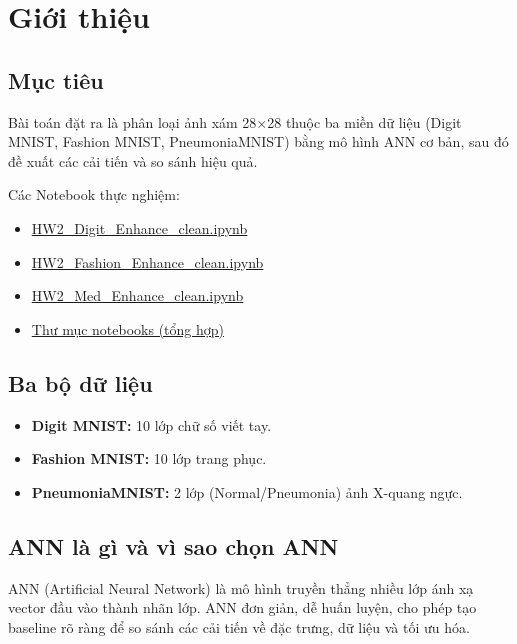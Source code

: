 \documentclass[a4paper,12pt]{report}
\begin{document}
\newpage
\listoffigures
\newpage
\listoftables
\newpage
\tableofcontents
\newpage

\section{Giới thiệu}
\subsection{Mục tiêu}
Bài toán đặt ra là phân loại ảnh xám 28$\times$28 thuộc ba miền dữ liệu (Digit MNIST, Fashion MNIST, PneumoniaMNIST) bằng mô hình ANN cơ bản, sau đó đề xuất các cải tiến và so sánh hiệu quả.

Các Notebook thực nghiệm:
\begin{itemize}
    \item \href{https://github.com/Le-Anh-Duy/CV-HOMEWORK-2-Mnist-EDA/blob/main/notebooks/HW2_Digit_Enhance_clean.ipynb}{HW2\_Digit\_Enhance\_clean.ipynb}
    \item \href{https://github.com/Le-Anh-Duy/CV-HOMEWORK-2-Mnist-EDA/blob/main/notebooks/HW2_Fashion_Enhance_clean.ipynb}{HW2\_Fashion\_Enhance\_clean.ipynb}
    \item \href{https://github.com/Le-Anh-Duy/CV-HOMEWORK-2-Mnist-EDA/blob/main/notebooks/HW2_Med_Enhance_clean.ipynb}{HW2\_Med\_Enhance\_clean.ipynb}
    \item \href{https://github.com/Le-Anh-Duy/CV-HOMEWORK-2-Mnist-EDA/tree/main/notebooks}{Thư mục notebooks (tổng hợp)}
\end{itemize}

\subsection{Ba bộ dữ liệu}
\begin{itemize}
    \item \textbf{Digit MNIST:} 10 lớp chữ số viết tay.
    \item \textbf{Fashion MNIST:} 10 lớp trang phục.
    \item \textbf{PneumoniaMNIST:} 2 lớp (Normal/Pneumonia) ảnh X-quang ngực.
\end{itemize}

\subsection{ANN là gì và vì sao chọn ANN}
ANN (Artificial Neural Network) là mô hình truyền thẳng nhiều lớp ánh xạ vector đầu vào thành nhãn lớp. ANN đơn giản, dễ huấn luyện, cho phép tạo baseline rõ ràng để so sánh các cải tiến về đặc trưng, dữ liệu và tối ưu hóa.
\end{document}
